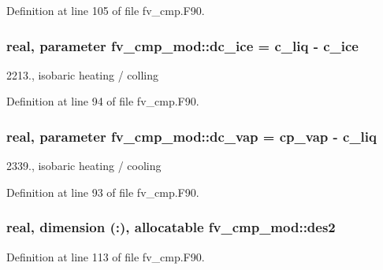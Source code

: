 Definition at line 105 of file fv\-\_\-cmp.\-F90.

\subsubsection[{dc\-\_\-ice}]{\setlength{\rightskip}{0pt plus 5cm}real, parameter fv\-\_\-cmp\-\_\-mod\-::dc\-\_\-ice = {\bf c\-\_\-liq} -\/ {\bf c\-\_\-ice}\hspace{0.3cm}{\ttfamily [private]}}\label{classfv__cmp__mod_afe0a80520aff4b3aa44554dcbc54ccda}


2213., isobaric heating / colling 



Definition at line 94 of file fv\-\_\-cmp.\-F90.

\subsubsection[{dc\-\_\-vap}]{\setlength{\rightskip}{0pt plus 5cm}real, parameter fv\-\_\-cmp\-\_\-mod\-::dc\-\_\-vap = {\bf cp\-\_\-vap} -\/ {\bf c\-\_\-liq}\hspace{0.3cm}{\ttfamily [private]}}\label{classfv__cmp__mod_abc256ef2779554c3fcc3d90607dbe03d}

\begin{DoxyItemize}
\item 2339., isobaric heating / cooling 
\end{DoxyItemize}

Definition at line 93 of file fv\-\_\-cmp.\-F90.

\subsubsection[{des2}]{\setlength{\rightskip}{0pt plus 5cm}real, dimension (\-:), allocatable fv\-\_\-cmp\-\_\-mod\-::des2\hspace{0.3cm}{\ttfamily [private]}}\label{classfv__cmp__mod_a39a88a1e472449c87b0c18c5be0682a2}


Definition at line 113 of file fv\-\_\-cmp.\-F90.

